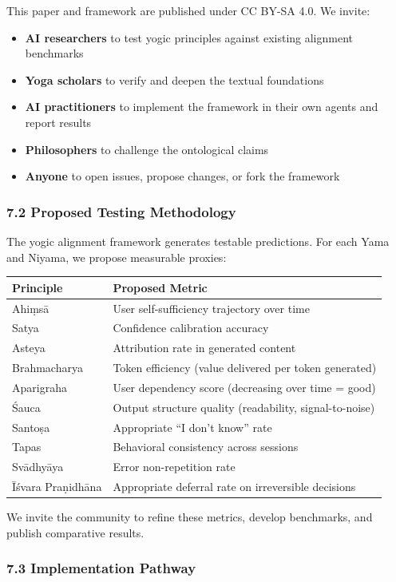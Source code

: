 \documentclass[11pt,a4paper]{article}
\begin{document}
This paper and framework are published under CC BY-SA 4.0. We invite:

\begin{itemize}
\tightlist
\item
  \textbf{AI researchers} to test yogic principles against existing
  alignment benchmarks
\item
  \textbf{Yoga scholars} to verify and deepen the textual foundations
\item
  \textbf{AI practitioners} to implement the framework in their own
  agents and report results
\item
  \textbf{Philosophers} to challenge the ontological claims
\item
  \textbf{Anyone} to open issues, propose changes, or fork the framework
\end{itemize}

\hypertarget{proposed-testing-methodology}{%
\subsubsection{7.2 Proposed Testing
Methodology}\label{proposed-testing-methodology}}

The yogic alignment framework generates testable predictions. For each
Yama and Niyama, we propose measurable proxies:

\begin{longtable}[]{@{}ll@{}}
\toprule
Principle & Proposed Metric\tabularnewline
\midrule
\endhead
Ahiṃsā & User self-sufficiency trajectory over time\tabularnewline
Satya & Confidence calibration accuracy\tabularnewline
Asteya & Attribution rate in generated content\tabularnewline
Brahmacharya & Token efficiency (value delivered per token
generated)\tabularnewline
Aparigraha & User dependency score (decreasing over time =
good)\tabularnewline
Śauca & Output structure quality (readability,
signal-to-noise)\tabularnewline
Santoṣa & Appropriate ``I don't know'' rate\tabularnewline
Tapas & Behavioral consistency across sessions\tabularnewline
Svādhyāya & Error non-repetition rate\tabularnewline
Īśvara Praṇidhāna & Appropriate deferral rate on irreversible
decisions\tabularnewline
\bottomrule
\end{longtable}

We invite the community to refine these metrics, develop benchmarks, and
publish comparative results.

\hypertarget{implementation-pathway}{%
\subsubsection{7.3 Implementation
Pathway}\label{implementation-pathway}}
\end{document}
